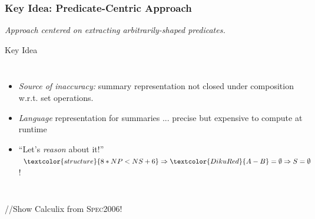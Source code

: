 \documentclass{beamer}
\renewcommand{\emph}[1]{\textcolor{structure}{#1}}
\newcommand{\emp}[1]{\textcolor{DikuRed}{ #1}}
\begin{document}
\begin{frame}[fragile,t]
  \frametitle{Key Idea: Predicate-Centric Approach}

\smallskip

{\em Approach centered on extracting arbitrarily-shaped predicates.} 

\bigskip

\begin{block}{Key Idea} 
\begin{columns} 
 \vspace{-2ex}
\begin{itemize}
    \item \emp{{\em Source of inaccuracy:}} summary representation not closed under composition w.r.t. set operations. \bigskip
    \item \emph{{\em Language}} representation for summaries ... precise but \emp{expensive} to compute at runtime \bigskip
    \item ``Let's \emph{{\em reason}} about it!'' $\emph{8*NP < NS + 6} \Rightarrow \emp{A - B} = \emptyset \Rightarrow S=\emptyset$!
\end{itemize}
\hspace{-2ex}\includegraphics[height=30ex]{ParTeaserFigs/USR_HE_FIND_SOLVH}
\end{columns}
\end{block}

//\alert{Show Calculix from \textsc{Spec2006}}!

\end{frame}
\end{document}
